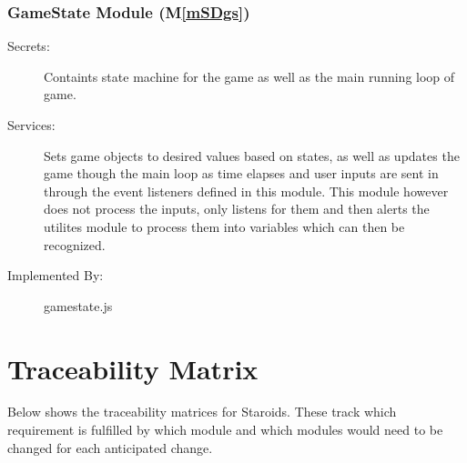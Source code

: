 \documentclass[12pt, titlepage]{article}
\newcommand{\mref}[1]{M\ref{#1}}
\begin{document}
\subsubsection{GameState Module (\mref{mSDgs})}
\begin{description}
\item[Secrets:] Containts state machine for the game as well as the main running loop of game.
\item[Services:] Sets game objects to desired values based on states, as well as updates the game though the main loop as time elapses and user inputs are sent in through the event listeners defined in this module. This module however does not process the inputs, only listens for them and then alerts the utilites module to process them into variables which can then be recognized.
\item[Implemented By:] gamestate.js
\end{description}

\section{Traceability Matrix} \label{SecTM}

Below shows the traceability matrices for Staroids. These track which requirement is fulfilled by which module and which modules would need to be changed for each anticipated change.
\end{document}
